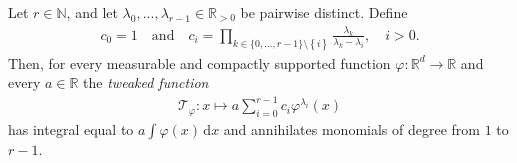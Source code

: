 \begin{lemma}[Tweaking]\label{tweaking-lemma}
    Let $r \in \mathbb{N}$, and let $\lambda_0,...,\lambda_{r-1} \in \mathbb{R}_{>0}$ be pairwise distinct. Define 
    \begin{align*}
        c_0 = 1 \quad \text{and} \quad 
        c_i = \prod_{k \in \{0,...,r-1\} \setminus\left\{ i \right\} } \frac{\lambda_k}{\lambda_k - \lambda_i}, \quad i > 0.
    \end{align*}
    Then, for every measurable and compactly supported function $\varphi: \mathbb{R}^d \to \mathbb{R}$ and every $a \in \mathbb{R}$ the \emph{tweaked function}  
    \begin{align*}
        \mathcal{T}_{\varphi}: x \mapsto a\sum^{r-1}_{i=0}c_i\varphi^{\lambda_i}(x)
    \end{align*}
    has integral equal to $a \int \varphi(x) \, \mathrm{d}x$ and annihilates monomials of degree from $1$ to $r-1$.
\end{lemma}

